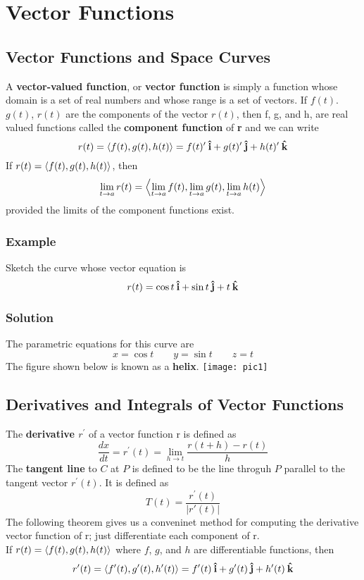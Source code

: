 \setcounter{chapter}{13}
\chapter{Vector Functions}

\section{Vector Functions and Space Curves}
A \textbf{vector-valued function}, or \textbf{vector function} is simply a function whose domain is a set of real numbers and whose range is a set of vectors.
If $f(t)$. $g(t)$, $r(t)$ are the components of the vector $r(t)$, then f, g, and h, are real valued functions called the \textbf{component function} of \textbf{r} and we can write
$$r(t) = \ev{f(t), g(t), h(t)} = f(t)^\prime\ihat + g(t)^\prime\jhat + h(t)^\prime\khat$$
If $r(t) = \ev{f(t), g(t), h(t)}$, then $$\lim_{t\rightarrow a}r(t) = \ev{\lim_{t\rightarrow a}f(t), \lim_{t\rightarrow a}g(t), \lim_{t\rightarrow a}h(t)} $$ provided the limits of the component functions exist.

\subsection*{Example}
Sketch the curve whose vector equation is $$r(t) = \cos{t}\:\boldsymbol{\hat{\textbf{i}}} + \sin{t}\:\boldsymbol{\hat{\textbf{j}}} + t\:\boldsymbol{\hat{\textbf{k}}}$$
\subsection*{Solution}
The parametric equations for this curve are $$x = \cos{t}\qquad y = \sin{t}\qquad z = t$$ The figure shown below is known as a \textbf{helix}.
\texttt{[image: pic1]}

\section{Derivatives and Integrals of Vector Functions}
The \textbf{derivative $r^\prime$} of a vector function r is defined as $$\frac{dx}{dt} = r^\prime(t) = \lim_{h\rightarrow t}\frac{r(t+h) - r(t)}{h}$$
The \textbf{tangent line} to $C$ at $P$ is defined to be the line throguh $P$ parallel to the tangent vector $r^\prime(t)$. It is defined as 
$$T(t) = \frac{r^\prime(t)}{|r'(t)|}$$
The following theorem gives us a conveninet method for computing the derivative vector function of r; just differentiate each component of r.\\
If $r(t) = \ev{f(t), g(t), h(t)}$ where $f$, $g$, and $h$ are differentiable functions, then 
$$r^\prime(t) = \ev{f^\prime(t), g^\prime(t), h^\prime(t)} = f^\prime(t)\ihat + g^\prime(t)\jhat + h^\prime(t)\khat$$

